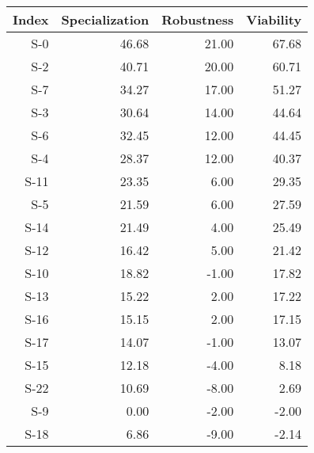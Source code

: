 \begin{tabular}{ | r | r | r | r | }
    \hline
                 Index  &  Specialization  &      Robustness  &       Viability  \\
    \hline
    \hline
                   S-0  &           46.68  &           21.00  &           67.68  \\
    \hline
                   S-2  &           40.71  &           20.00  &           60.71  \\
    \hline
                   S-7  &           34.27  &           17.00  &           51.27  \\
    \hline
                   S-3  &           30.64  &           14.00  &           44.64  \\
    \hline
                   S-6  &           32.45  &           12.00  &           44.45  \\
    \hline
                   S-4  &           28.37  &           12.00  &           40.37  \\
    \hline
                  S-11  &           23.35  &            6.00  &           29.35  \\
    \hline
                   S-5  &           21.59  &            6.00  &           27.59  \\
    \hline
                  S-14  &           21.49  &            4.00  &           25.49  \\
    \hline
                  S-12  &           16.42  &            5.00  &           21.42  \\
    \hline
                  S-10  &           18.82  &           -1.00  &           17.82  \\
    \hline
                  S-13  &           15.22  &            2.00  &           17.22  \\
    \hline
                  S-16  &           15.15  &            2.00  &           17.15  \\
    \hline
                  S-17  &           14.07  &           -1.00  &           13.07  \\
    \hline
                  S-15  &           12.18  &           -4.00  &            8.18  \\
    \hline
                  S-22  &           10.69  &           -8.00  &            2.69  \\
    \hline
                   S-9  &            0.00  &           -2.00  &           -2.00  \\
    \hline
                  S-18  &            6.86  &           -9.00  &           -2.14  \\

\end{tabular}
